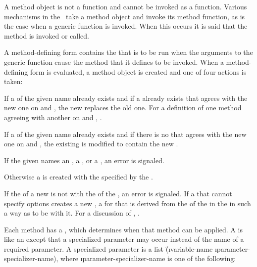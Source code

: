 A method object is not a function and cannot be invoked as a function. 
Various mechanisms in the \OS\ take a method object and invoke its method
function, as is the case when a generic function is invoked.  When this
occurs it is said that the method is invoked or called.

A method-defining form contains the  that is to be run when the
arguments to the generic function cause the method that it defines to
be invoked.  When a method-defining form is evaluated, a method object
is created and one of four actions is taken:

\beginlist

\itemitem{\bull} If a  of the given name already exists
and if a  already exists that agrees with the new one on
 and , the new  replaces
the old one.  For a definition of one method agreeing with another on
 and , 
\seesection\SpecializerQualifierAgreement.

\itemitem{\bull} If a  of the given name already exists
and if there is no  that agrees with the new one on
 and , the existing 
 is modified to contain the new  .

\itemitem{\bull} If the given  names an , a ,
or a , an error is signaled.

\itemitem{\bull} Otherwise a  is created with the 
specified by the .

\endlist

If the  of a new  is not
 with the  of the ,
an error is signaled.  If a  that cannot specify
 options creates a new , 
a  for that  is derived from the
 of the  in the  in such a way
as to be  with it.  For a discussion of ,
\seesection\GFMethodLambdaListCongruency.

Each method has a , which determines
when that method can be applied.  A  is like
an  except that a specialized parameter
may occur instead of the name of a required parameter.  A specialized parameter
is a list \f{(\i{variable-name} \i{parameter-specializer-name})},
where \i{parameter-specializer-name} is one of the following:

